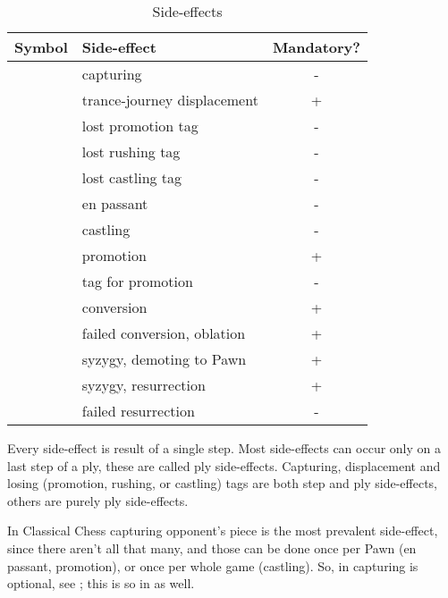 \begin{table}[!h]
\centering
\begin{tabular}{ rlc }
\toprule
\textbf{Symbol}      & \textbf{Side-effect}           & \textbf{Mandatory?}   \\
\midrule
\alg{*}              & capturing                      & -                     \\
\alg{<}              & trance-journey displacement    & +                     \\ \cmidrule{1-3}
\alg{==}             & lost promotion tag             & -                     \\
\alg{::}             & lost rushing tag               & -                     \\
\alg{\&\&}           & lost castling tag              & -                     \\ \cmidrule{1-3}
\alg{:}              & en passant                     & -                     \\
\alg{\&}             & castling                       & -                     \\
\alg{=}              & promotion                      & +                     \\
\alg{=}              & tag for promotion              & -                     \\
\alg{\%}             & conversion                     & +                     \\
\alg{\%\%}           & failed conversion, oblation    & +                     \\
\alg{>}              & syzygy, demoting to Pawn       & +                     \\
\alg{\$}             & syzygy, resurrection           & +                     \\
\alg{\$\$}           & failed resurrection            & -                     \\
\bottomrule
\end{tabular}
\caption{Side-effects}
\label{tbl:Appendix/Summary/Side-effects}
\end{table}

Every side-effect is result of a single step. Most side-effects can occur only on a last step of
a ply, these are called ply side-effects. Capturing, displacement and losing (promotion, rushing,
or castling) tags are both step and ply side-effects, others are purely ply side-effects.

In Classical Chess capturing opponent's piece is the most prevalent side-effect, since there aren't
all that many, and those can be done once per Pawn (en passant, promotion), or once per whole game
(castling). So, in  capturing is optional, see ; this is so in
 as well.

